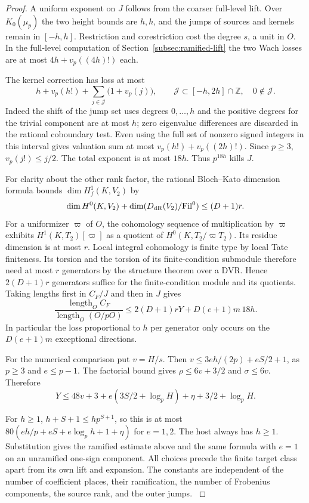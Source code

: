 \begin{proof}
A uniform exponent on \(J\) follows from the coarser full-level lift.
Over \(K_0(\mu_p)\) the two height bounds are \(h,h\), and the jumps
of sources and kernels remain in \([-h,h]\). Restriction and
corestriction cost the degree \(s\), a unit in \(O\).
In the full-level computation of Section~\ref{subsec:ramified-lift}
the two Wach losses are at most \(4h+v_p((4h)!)\) each.

The
kernel correction has loss at most
\[
 h+v_p(h!)+\sum_{j\in\mathcal J}\bigl(1+v_p(j)\bigr),
 \qquad
 \mathcal J\subset[-h,2h]\cap\mathbb Z,\quad 0\notin\mathcal J .
\]
Indeed the shift of the jump set uses degrees \(0,\ldots,h\) and
the positive degrees for the trivial component are at most \(h\);
zero eigenvalue differences are discarded in the rational coboundary
test. Even using the full set of nonzero signed integers in this
interval gives valuation sum at most \(v_p(h!)+v_p((2h)!)\).
Since \(p\ge3\), \(v_p(j!)\le j/2\). The total exponent is at most
\(18h\). Thus \(p^{18h}\) kills \(J\).

For clarity about the other rank factor, the rational Bloch--Kato
dimension formula bounds \(\dim H^1_f(K,V_2)\) by
\[
 \dim H^0(K,V_2)+\dim(D_{\rm dR}(V_2)/{\rm Fil}^0) \le (D+1)r.
\]
For a uniformizer \(\varpi\) of \(O\), the
cohomology sequence of multiplication by \(\varpi\) exhibits
\(H^1(K,T_2)[\varpi]\) as a quotient of \(H^0(K,T_2/\varpi T_2)\).
Its residue dimension is at most \(r\). Local integral cohomology
is finite type by local Tate finiteness. Its torsion and the
torsion of its finite-condition submodule therefore need at most
\(r\) generators by the structure theorem over a DVR.
Hence \(2(D+1)r\) generators suffice for the finite-condition
module and its quotients. Taking lengths first in \(C_F/J\) and
then in \(J\) gives
\[
 \frac{\operatorname{length}_O C_F}{\operatorname{length}_O(O/pO)}
     \le 2(D+1)rY+D(e+1)m\,18h .
\]
In particular the loss proportional to \(h\) per generator only
occurs on the \(D(e+1)m\) exceptional directions.

For the numerical comparison put \(v=H/s\). Then
\(v\le 3eh/(2p)+eS/2+1\), as \(p\ge3\) and \(e\le p-1\).
The factorial bound gives \(\rho\le6v+3/2\) and \(\sigma\le6v\).
Therefore
\[
 Y\le48v+3+e(3S/2+\log_p H)+\eta+3/2+\log_p H .
\]

For \(h\ge1\), \(h+S+1\le h p^{S+1}\), so this is at most
\(80(eh/p+eS+e\log_p h+1+\eta)\) for \(e=1,2\).
The host always has \(h\ge1\). Substitution gives the ramified
estimate above and the same formula with \(e=1\) on an unramified
one-sign component. All choices precede the finite target class
apart from its own lift and expansion. The constants are independent
of the number of coefficient places, their ramification, the number
of Frobenius components, the source rank, and the outer jumps.
\label{cor:row-colength-1}
\end{proof}
